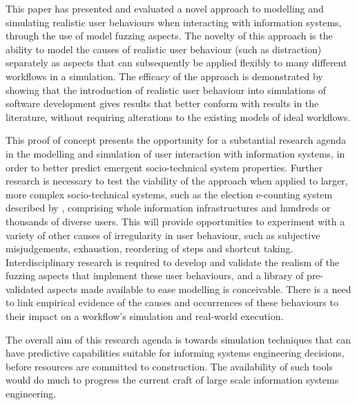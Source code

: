 \documentclass{llncs}
\begin{document}
This paper has presented and evaluated a novel approach to modelling and simulating realistic user behaviours when
interacting with information systems, through the use of model fuzzing aspects.  The novelty of this approach is the
ability to model the causes of realistic user behaviour (such as distraction) separately as aspects that can
subsequently be applied flexibly to many different workflows in a simulation. The efficacy of the approach is
demonstrated by showing that the introduction of realistic user behaviour into simulations of software development gives
results that better conform with results in the literature, without requiring alterations to the
existing models of ideal workflows.

This proof of concept presents the opportunity for a substantial research agenda in the modelling and simulation of user
interaction with information systems, in order to better predict emergent socio-technical system properties. Further
research is necessary to test the viability of the approach when applied to larger, more complex socio-technical
systems, such as the election e-counting system described by \citet{lock07observations}, comprising whole information
infrastructures and hundreds or thousands of diverse users.  This will provide opportunities to experiment with a
variety of other causes of irregularity in user behaviour, such as subjective misjudgements, exhaustion, reordering of
steps and shortcut taking.  Interdisciplinary research is required to develop and validate the realism of the fuzzing
aspects that implement these user behaviours, and a library of pre-validated aspects made available to ease modelling is
conceivable. There is a need to link empirical evidence of the causes and occurrences of these behaviours to their
impact on a workflow's simulation and real-world execution.

The overall aim of this research agenda is towards simulation techniques that can have predictive capabilities suitable
for informing systems engineering decisions, before resources are committed to construction.  The availability of such
tools would do much to progress the current craft of large scale information systems engineering.







\end{document}

